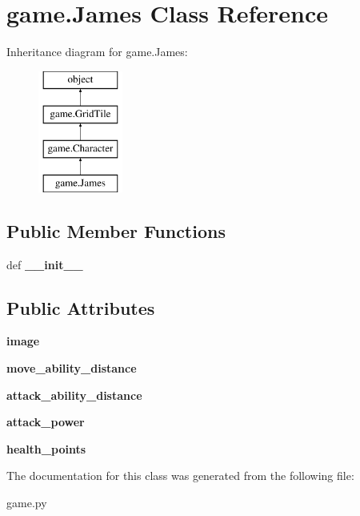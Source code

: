 \hypertarget{classgame_1_1James}{\section{game.\-James Class Reference}
\label{classgame_1_1James}
}
Inheritance diagram for game.\-James\-:\begin{figure}[H]
\begin{center}
\leavevmode
\includegraphics[height=4.000000cm]{classgame_1_1James}
\end{center}
\end{figure}
\subsection*{Public Member Functions}
\begin{DoxyCompactItemize}
\item 
\hypertarget{classgame_1_1James_ad5a69f9fa2b4826c3049aa64a10a9230}{def {\bfseries \-\_\-\-\_\-init\-\_\-\-\_\-}}\label{classgame_1_1James_ad5a69f9fa2b4826c3049aa64a10a9230}

\end{DoxyCompactItemize}
\subsection*{Public Attributes}
\begin{DoxyCompactItemize}
\item 
\hypertarget{classgame_1_1James_a80d7a25b9e092b647d15210a350159af}{{\bfseries image}}\label{classgame_1_1James_a80d7a25b9e092b647d15210a350159af}

\item 
\hypertarget{classgame_1_1James_a5bf9fd83a693a20a1d15286a36586b22}{{\bfseries move\-\_\-ability\-\_\-distance}}\label{classgame_1_1James_a5bf9fd83a693a20a1d15286a36586b22}

\item 
\hypertarget{classgame_1_1James_a5412e38e60f9385daddcb66d9d9cc851}{{\bfseries attack\-\_\-ability\-\_\-distance}}\label{classgame_1_1James_a5412e38e60f9385daddcb66d9d9cc851}

\item 
\hypertarget{classgame_1_1James_ae85fc663dbfc04f0ad0ca22d74ef96a8}{{\bfseries attack\-\_\-power}}\label{classgame_1_1James_ae85fc663dbfc04f0ad0ca22d74ef96a8}

\item 
\hypertarget{classgame_1_1James_a3dbfe488804ef3cbd605813a0030e89a}{{\bfseries health\-\_\-points}}\label{classgame_1_1James_a3dbfe488804ef3cbd605813a0030e89a}

\end{DoxyCompactItemize}


The documentation for this class was generated from the following file\-:\begin{DoxyCompactItemize}
\item 
game.\-py\end{DoxyCompactItemize}
